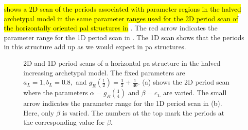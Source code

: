  \hl{shows a 2D scan of the periods associated with parameter regions in the halved archetypal model in the same parameter ranges used for the 2D period scan of the horizontally oriented \gls{pal} structures in} .
The red arrow indicates the parameter range for the 1D period scan in .
The 1D scan shows that the periods in this structure add up as we would expect in \gls{pa} structures.

\begin{figure}
	\centering
	\caption[2D and 1D period scans of a horizontal period-adding structure in the halved increasing archetypal model]{
		2D and 1D period scans of a horizontal \gls{pa} structure in the halved increasing archetypal model.
		The fixed parameters are $a_L = 1, b_L = 0.8,$ and $g_R\left(\frac{1}{2}\right) = \frac{1}{2} + \frac{1}{40}$.
		(a) shows the 2D period scan where the parameters $\alpha = g_R\left(\frac{1}{4}\right)$ and $\beta = c_L$ are varied.
		The small arrow indicates the parameter range for the 1D period scan in (b).
		Here, only $\beta$ is varied.
		The numbers at the top mark the periods at the corresponding value for $\beta$.
	}
	\label{fig:add.halved.hor}
\end{figure}

